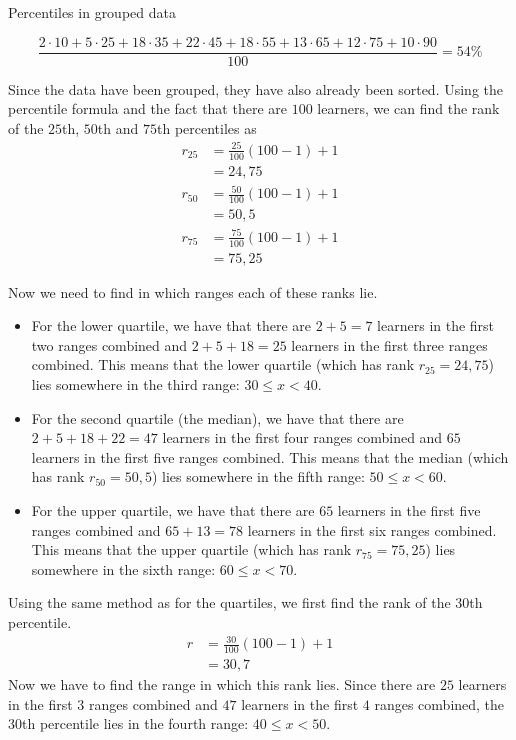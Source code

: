 \begin{wex}{Percentiles in grouped data}
{  \begin{equation}
    \frac{
         2 \cdot 10
      +  5 \cdot 25
      + 18 \cdot 35
      + 22 \cdot 45
      + 18 \cdot 55
      + 13 \cdot 65
      + 12 \cdot 75
      + 10 \cdot 90
    }{100}
    = 54\%
  \end{equation}


  Since the data have been grouped, they have also already been
  sorted. Using the percentile formula and the fact that there are
  $100$ learners, we can find the rank of the $25$th, $50$th and
  $75$th percentiles as
  \begin{align}
    r_{25} &= \frac{25}{100}\left(100-1\right)+1 \\
          &= 24,75 \\
    r_{50} &= \frac{50}{100}\left(100-1\right)+1 \\
          &= 50,5 \\
    r_{75} &= \frac{75}{100}\left(100-1\right)+1 \\
          &= 75,25
  \end{align}

  Now we need to find in which ranges each of these ranks lie.
  \begin{itemize}
  \item For the lower quartile, we have that there are $2 + 5 = 7$
    learners in the first two ranges combined and $2 + 5 + 18 = 25$
    learners in the first three ranges combined. This means that the
    lower quartile (which has rank $r_{25} = 24,75$) lies somewhere in
    the third range: $30 \le x < 40$.
  \item For the second quartile (the median), we have that there are
    $2 + 5 + 18 + 22 = 47$ learners in the first four ranges combined
    and $65$ learners in the first five ranges
    combined. This means that the median (which has rank $r_{50} =
    50,5$) lies somewhere in the fifth range: $50 \le x < 60$.
  \item For the upper quartile, we have that there are $65$ learners
    in the first five ranges combined and $65 + 13 = 78$ learners in
    the first six ranges combined. This means that the upper quartile
    (which has rank $r_{75} = 75,25$) lies somewhere in the sixth range: $60
    \le x < 70$.
  \end{itemize}


  Using the same method as for the quartiles, we first find the rank
  of the $30$th percentile.
  \begin{align}
    r &= \frac{30}{100}\left(100-1\right)+1 \\
      &= 30,7
  \end{align}
  Now we have to find the range in which this rank lies. Since there
  are $25$ learners in the first $3$ ranges combined and $47$ learners
  in the first $4$ ranges combined, the $30$th percentile lies in the
  fourth range: $40 \le x < 50$.

}
\end{wex}

